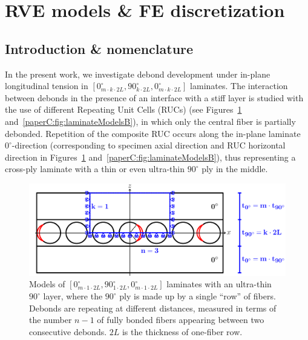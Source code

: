 \section{RVE models \& FE discretization}


\subsection{Introduction \& nomenclature}\label{paperC:subsec:names}

In the present work, we investigate debond development under in-plane longitudinal tension in $\left[0_{m\cdot k\cdot2L}^{\circ},90_{k\cdot2L}^{\circ},0_{m\cdot k\cdot2L}^{\circ}\right]$ laminates. The interaction between debonds in the presence of an interface with a stiff layer is studied with the use of different Repeating Unit Cells (RUCs)  (see Figures~\ref{paperC:fig:laminateModelsA} and~\ref{paperC:fig:laminateModelsB}), in which only the central fiber is partially debonded. Repetition of the composite RUC occurs along the in-plane laminate $0^{\circ}$-direction (corresponding to specimen axial direction and RUC horizontal direction in Figures~\ref{paperC:fig:laminateModelsA} and~\ref{paperC:fig:laminateModelsB}), thus representing a cross-ply laminate with a thin or even ultra-thin $90^{\circ}$ ply in the middle.\\

\begin{figure}[!htb]
\centering
  \includegraphics[width=\textwidth]{paperC/thinPly.pdf}
\caption{Models of $\left[0_{m\cdot 1\cdot2L}^{\circ},90_{1\cdot2L}^{\circ},0_{m\cdot 1\cdot2L}^{\circ}\right]$ laminates with an ultra-thin $90^{\circ}$ layer, where the $90^{\circ}$ ply is made up by a single ``row'' of fibers. Debonds are repeating at different distances, measured in terms of the number $n-1$ of fully bonded fibers appearing between two consecutive debonds. $2L$ is the thickness of one-fiber row.}\label{paperC:fig:laminateModelsA}
\end{figure}

